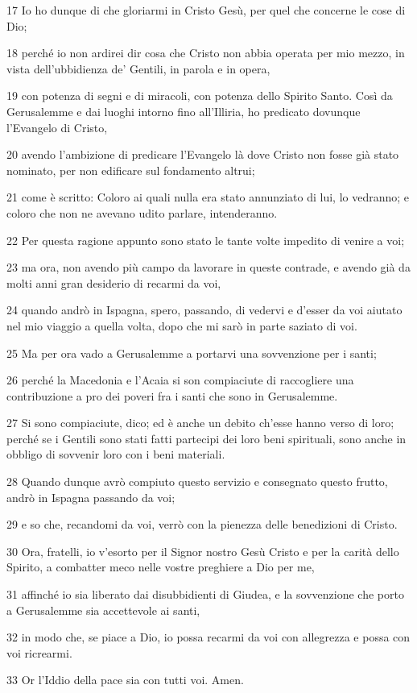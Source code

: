 \par 17 Io ho dunque di che gloriarmi in Cristo Gesù, per quel che concerne le cose di Dio;
\par 18 perché io non ardirei dir cosa che Cristo non abbia operata per mio mezzo, in vista dell'ubbidienza de' Gentili, in parola e in opera,
\par 19 con potenza di segni e di miracoli, con potenza dello Spirito Santo. Così da Gerusalemme e dai luoghi intorno fino all'Illiria, ho predicato dovunque l'Evangelo di Cristo,
\par 20 avendo l'ambizione di predicare l'Evangelo là dove Cristo non fosse già stato nominato, per non edificare sul fondamento altrui;
\par 21 come è scritto: Coloro ai quali nulla era stato annunziato di lui, lo vedranno; e coloro che non ne avevano udito parlare, intenderanno.
\par 22 Per questa ragione appunto sono stato le tante volte impedito di venire a voi;
\par 23 ma ora, non avendo più campo da lavorare in queste contrade, e avendo già da molti anni gran desiderio di recarmi da voi,
\par 24 quando andrò in Ispagna, spero, passando, di vedervi e d'esser da voi aiutato nel mio viaggio a quella volta, dopo che mi sarò in parte saziato di voi.
\par 25 Ma per ora vado a Gerusalemme a portarvi una sovvenzione per i santi;
\par 26 perché la Macedonia e l'Acaia si son compiaciute di raccogliere una contribuzione a pro dei poveri fra i santi che sono in Gerusalemme.
\par 27 Si sono compiaciute, dico; ed è anche un debito ch'esse hanno verso di loro; perché se i Gentili sono stati fatti partecipi dei loro beni spirituali, sono anche in obbligo di sovvenir loro con i beni materiali.
\par 28 Quando dunque avrò compiuto questo servizio e consegnato questo frutto, andrò in Ispagna passando da voi;
\par 29 e so che, recandomi da voi, verrò con la pienezza delle benedizioni di Cristo.
\par 30 Ora, fratelli, io v'esorto per il Signor nostro Gesù Cristo e per la carità dello Spirito, a combatter meco nelle vostre preghiere a Dio per me,
\par 31 affinché io sia liberato dai disubbidienti di Giudea, e la sovvenzione che porto a Gerusalemme sia accettevole ai santi,
\par 32 in modo che, se piace a Dio, io possa recarmi da voi con allegrezza e possa con voi ricrearmi.
\par 33 Or l'Iddio della pace sia con tutti voi. Amen.

